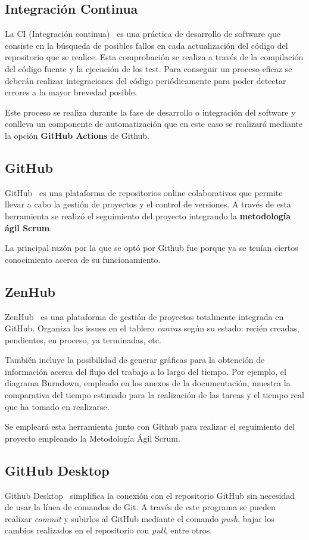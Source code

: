 \subsection{Integración Continua}
La CI (Integración continua)~\cite{pagina_CI} es una práctica de desarrollo de software que consiste en la búsqueda de posibles fallos en cada actualización del código del repositorio que se realice. Esta comprobación se realiza a través de la compilación del código fuente y la ejecución de los test. Para conseguir un proceso eficaz se deberán realizar integraciones del código periódicamente para poder detectar errores a la mayor brevedad posible.

Este proceso se realiza durante la fase de desarrollo o integración del software y conlleva un componente de automatización que en este caso se realizará mediante la opción \textbf{GitHub Actions} de Github.

\subsection{GitHub}
GitHub~\cite{pagina_github} es una plataforma de repositorios online colaborativos que permite llevar a cabo la gestión de proyectos y el control de versiones. A través de esta herramienta se realizó el seguimiento del proyecto integrando la \textbf{metodología ágil Scrum}.
 
La principal razón por la que se optó por Github fue porque ya se tenían ciertos conocimiento acerca de su funcionamiento. 

\subsection{ZenHub}
ZenHub~\cite{pagina_zenhub} es una plataforma de gestión de proyectos totalmente integrada en GitHub. Organiza las issues en el tablero \emph{canvas} según su estado: recién creadas, pendientes, en proceso, ya terminadas, etc. 

También incluye la posibilidad de generar gráficas para la obtención de información acerca del flujo del trabajo a lo largo del tiempo. Por ejemplo, el diagrama Burndown, empleado en los anexos de la documentación, muestra la comparativa del tiempo estimado para la realización de las tareas y el tiempo real que ha tomado en realizarse.

Se empleará esta herramienta junto con Github para realizar el seguimiento del proyecto empleando la Metodología Ágil Scrum.

\subsection{GitHub Desktop}
Github Desktop~\cite{pagina_github_desktop} simplifica la conexión con el repositorio GitHub sin necesidad de usar la línea de comandos de Git. A través de este programa se pueden realizar \emph{commit} y subirlos al GitHub mediante el comando \emph{push}, bajar los cambios realizados en el repositorio con \emph{pull}, entre otros.  